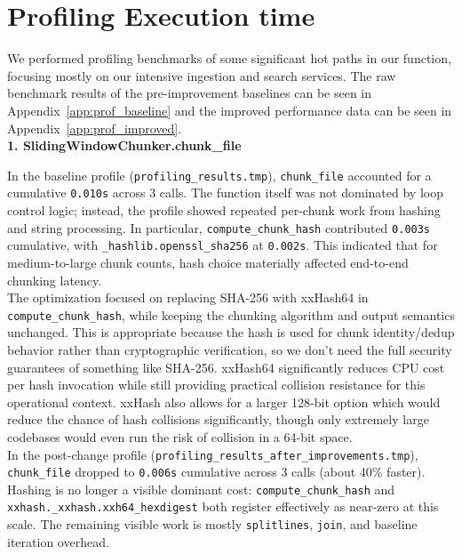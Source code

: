 \documentclass[a4paper,12pt]{article}
\begin{document}

\newpage
\section{Profiling Execution time}

We performed profiling benchmarks of some significant hot paths in our function, focusing mostly on our intensive ingestion and search services. The raw benchmark results of the pre-improvement baselines can be seen in Appendix~\ref{app:prof_baseline} and the improved performance data can be seen in Appendix~\ref{app:prof_improved}. \\

\textbf{1. SlidingWindowChunker.chunk\_file}

In the baseline profile (\texttt{profiling\_results.tmp}), \texttt{chunk\_file} accounted for a cumulative \texttt{0.010s} across 3 calls. The function itself was not dominated by loop control logic; instead, the profile showed repeated per-chunk work from hashing and string processing. In particular, \texttt{compute\_chunk\_hash} contributed \texttt{0.003s} cumulative, with \texttt{\_hashlib.openssl\_sha256} at \texttt{0.002s}. This indicated that for medium-to-large chunk counts, hash choice materially affected end-to-end chunking latency. \\

The optimization focused on replacing SHA-256 with xxHash64 in \texttt{compute\_chunk\_hash}, while keeping the chunking algorithm and output semantics unchanged. This is appropriate because the hash is used for chunk identity/dedup behavior rather than cryptographic verification, so we don't need the full security guarantees of something like SHA-256. xxHash64 significantly reduces CPU cost per hash invocation while still providing practical collision resistance for this operational context. xxHash also allows for a larger 128-bit option which would reduce the chance of hash collisions significantly, though only extremely large codebases would even run the risk of collision in a 64-bit space. \\

In the post-change profile (\texttt{profiling\_results\_after\_improvements.tmp}), \texttt{chunk\_file} dropped to \texttt{0.006s} cumulative across 3 calls (about 40\% faster). Hashing is no longer a visible dominant cost: \texttt{compute\_chunk\_hash} and \texttt{xxhash.\_xxhash.xxh64\_hexdigest} both register effectively as near-zero at this scale. The remaining visible work is mostly \texttt{splitlines}, \texttt{join}, and baseline iteration overhead. \\
\end{document}
